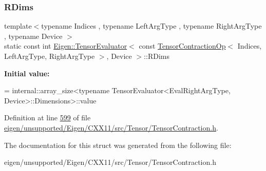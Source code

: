 \subsubsection{\texorpdfstring{R\+Dims}{RDims}}
{\footnotesize\ttfamily template$<$typename Indices , typename Left\+Arg\+Type , typename Right\+Arg\+Type , typename Device $>$ \\
static const int \hyperlink{struct_eigen_1_1_tensor_evaluator}{Eigen\+::\+Tensor\+Evaluator}$<$ const \hyperlink{class_eigen_1_1_tensor_contraction_op}{Tensor\+Contraction\+Op}$<$ Indices, Left\+Arg\+Type, Right\+Arg\+Type $>$, Device $>$\+::R\+Dims\hspace{0.3cm}{\ttfamily [static]}}

{\bfseries Initial value\+:}
\begin{DoxyCode}
=
      internal::array\_size<typename TensorEvaluator<EvalRightArgType, Device>::Dimensions>::value
\end{DoxyCode}


Definition at line \hyperlink{eigen_2unsupported_2_eigen_2_c_x_x11_2src_2_tensor_2_tensor_contraction_8h_source_l00599}{599} of file \hyperlink{eigen_2unsupported_2_eigen_2_c_x_x11_2src_2_tensor_2_tensor_contraction_8h_source}{eigen/unsupported/\+Eigen/\+C\+X\+X11/src/\+Tensor/\+Tensor\+Contraction.\+h}.



The documentation for this struct was generated from the following file\+:\begin{DoxyCompactItemize}
\item 
eigen/unsupported/\+Eigen/\+C\+X\+X11/src/\+Tensor/\+Tensor\+Contraction.\+h\end{DoxyCompactItemize}

